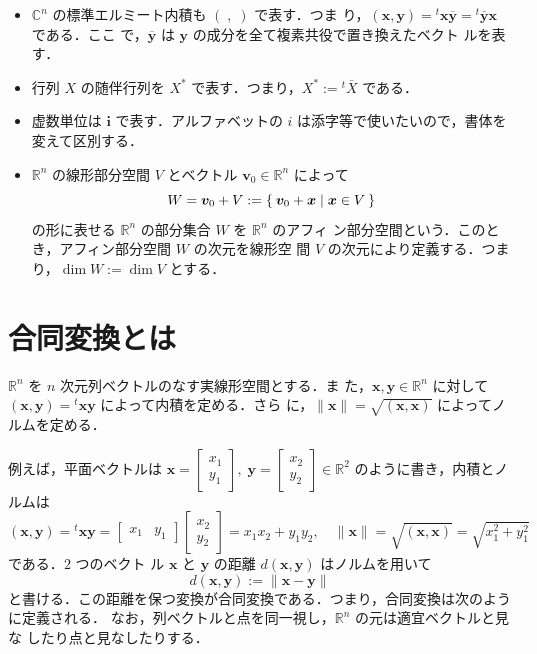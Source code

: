\documentclass[11pt, uplatex, dvipdfmx, titlepage]{jsarticle}
\renewcommand{\i}{\mathbf{i}}
\renewcommand{\bar}[1]{\overline{#1}}
\theoremstyle{definition}
\begin{document}
\begin{itemize}
 
\item $\mathbb{C}^n$ の標準エルミート内積も $( \; , \;)$ で表す．つま
  り，$(\bm{x}, \bm{y}) = {}^{t} \bm{x} \bar{\bm{y}}={}^{t}\bar{\bm{y}}\bm{x}$ である．ここ
  で，$\bar{\bm{y}}$ は $\bm{y}$ の成分を全て複素共役で置き換えたベクト
  ルを表す．

\item 行列 $X$ の随伴行列を $X^*$ で表す．つまり，$X^* := {}^{t}\bar{X}$ である．  

\item 虚数単位は $\i$ で表す．アルファベットの $i$ は添字等で使いたいので，書体を変えて区別する．
  
\item $\mathbb{R}^n$ の線形部分空間 $V$ とベクトル $\bm{v}_0 \in \mathbb{R}^n$ によって
  \[
    W = \bm{v}_0 + V := \Set{\bm{v}_0 + \bm{x} | \bm{x} \in V}
  \]
  の形に表せる $\mathbb{R}^n$ の部分集合 $W$ を $\mathbb{R}^n$ のアフィ
  ン部分空間という．このとき，アフィン部分空間 $W$ の次元を線形空
  間 $V$ の次元により定義する．つまり，$\dim W := \dim V$ とする．
  
\end{itemize}



\section{合同変換とは}\label{sec:whatis}
\thispagestyle{plain}


$\mathbb{R}^n$ を $n$ 次元列ベクトルのなす実線形空間とする．ま
た，$\bm{x}, \bm{y} \in \mathbb{R}^n$ に対して
$(\bm{x}, \bm{y}) = {}^{t}\bm{x} \bm{y}$ によって内積を定める．さら
に，$\| \bm{x}\| = \sqrt{(\bm{x}, \bm{x})}$ によってノルムを定める．

例えば，平面ベクトルは $\bm{x} = \left[
  \begin{array}{c}
    x_1\\
    y_1
  \end{array}
\right], \; \bm{y}= \left[
  \begin{array}{c}
    x_2\\
    y_2
  \end{array}
\right] \in \mathbb{R}^2$ のように書き，内積とノルムは
\[
  \left( \bm{x}, \bm{y}\right) = {}^{t}\bm{x} \bm{y} = \left[
    \begin{array}{cc}
      x_1 & y_1
    \end{array}
  \right] \left[
    \begin{array}{c}
      x_2\\
      y_2
    \end{array}
  \right] = x_1 x_2 + y_1 y_2, \quad \| \bm{x} \| = \sqrt{(\bm{x},\bm{x})} = \sqrt{x_1^2+y_1^2}
\]
である．$2$ つのベクト
ル $\bm{x}$ と $\bm{y}$ の距離 $d(\bm{x}, \bm{y})$ はノルムを用いて
\[
  d(\bm{x}, \bm{y}) :=\|\bm{x} - \bm{y} \|
\]
と書ける．この距離を保つ変換が合同変換である．つまり，合同変換は次のように定義される．
なお，列ベクトルと点を同一視し，$\mathbb{R}^n$ の元は適宜ベクトルと見な
したり点と見なしたりする．
\end{document}
